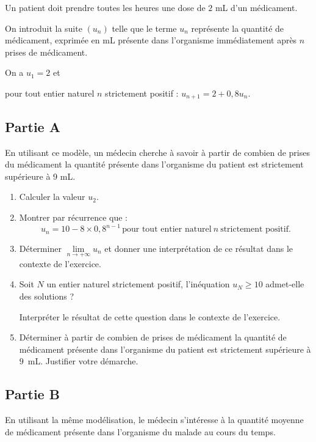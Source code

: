 Un patient doit prendre toutes les heures une dose de $2$ mL d'un médicament.

On introduit la suite $\left(u_n\right)$
telle que le terme $u_n$ représente la quantité de médicament, exprimée en mL présente dans l'organisme immédiatement après $n$ prises de médicament.

On a $u_1 = 2$ et 

\begin{center}pour tout entier naturel $n$ strictement positif : $u_{n+1} = 2 + 0,8u_n$.\end{center}

\subsection*{Partie A}

En utilisant ce modèle, un médecin cherche à savoir à partir de combien de prises du médicament la quantité présente dans l'organisme du patient est strictement supérieure à 9 mL.

\begin{enumerate}
\item Calculer la valeur $u_2$.
\item Montrer par récurrence que :
\[u_n = 10 - 8 \times 0{,}8^{n-1} \,\text{pour tout entier naturel} \:n \:\text{strictement
positif.}\]

\item Déterminer $\lim\limits_{n \to +\infty} u_n$ et donner une interprétation de ce résultat dans le contexte de l'exercice.
\item Soit $N$ un entier naturel strictement positif, l'inéquation $u_N \geqslant 10$ admet-elle des solutions ? 

Interpréter le résultat de cette question dans le contexte de l'exercice.
\item Déterminer à partir de combien de prises de médicament la quantité de médicament présente dans l'organisme du patient est strictement supérieure à $9$~mL. Justifier votre démarche.
\end{enumerate}

\subsection*{Partie B}

En utilisant la même modélisation, le médecin s'intéresse à la quantité moyenne de médicament présente dans l'organisme du malade au cours du temps.

